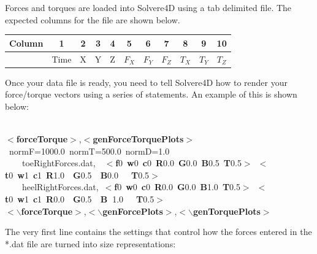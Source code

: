 \documentclass[singlecolumn,12pt]{article}
\newcommand{\hlstd}[1]{\textcolor[rgb]{0,0,0}{#1}}
\newcommand{\hlkey}[1]{\textcolor[rgb]{0,0,1}{\bf{#1}}}
\newcommand{\hlnum}[1]{\textcolor[rgb]{0.66,0,0.66}{#1}}
\begin{document}
Forces and torques are loaded into Solvere4D using a tab delimited
file. The expected columns for the file are shown below.

\vspace{1cm}
\begin{center}
\begin{tabular}{c|c|c|c|c|c|c|c|c|c|c|}
\hline Column & 1 & 2 & 3 & 4 & 5 & 6 & 7 & 8 & 9 & 10 \\
\hline & Time & X & Y & Z & $F_X$ & $F_Y$ & $F_Z$ & $T_X$ & $T_Y$ & $T_Z$\\
\end{tabular}
\end{center}
\vspace{1cm}

Once your data file is ready, you need to tell Solvere4D how to
render your force/torque vectors using a series of statements. An
example of this is shown below:

\vspace{1cm}
\hlstd{\\
}\hlkey{$<$forceTorque$>$}\hlstd{,}\hlkey{$<$genForceTorquePlots$>$}\hlstd{\ normF=}\hlnum{1000.0\ }\hlstd{normT=}\hlnum{500.0\ }\hlstd{normD=}\hlnum{1.0\\
\hlstd{\ \ \ \ }}\hlstd{toeRightForces.dat,\hlstd{\ \ }}\hlkey{$<$f}\hlnum{0\ }\hlkey{w}\hlnum{0\ }\hlkey{c}\hlnum{0\ }\hlkey{R}\hlnum{0.0\ }\hlkey{G}\hlnum{0.0\ }\hlkey{B}\hlnum{0.5\ }\hlkey{T}\hlnum{0.5}\hlkey{$>$}\hlstd{\ }\hlkey{$<$t}\hlnum{0\ }\hlkey{w}\hlnum{1\ }\hlkey{c}\hlnum{1\ }\hlkey{R}\hlnum{1.0\ \ }\hlkey{G}\hlnum{0.5\ \ }\hlkey{B}\hlnum{0.0\ \ \ }\hlkey{T}\hlnum{0.5}\hlkey{$>$}\hlstd{\\
\hlstd{\ \ \ \ }heelRightForces.dat,\ }\hlkey{$<$f}\hlnum{0\ }\hlkey{w}\hlnum{0\ }\hlkey{c}\hlnum{0\ }\hlkey{R}\hlnum{0.0\ }\hlkey{G}\hlnum{0.0\ }\hlkey{B}\hlnum{1.0\ }\hlkey{T}\hlnum{0.5}\hlkey{$>$}\hlstd{\ }\hlkey{$<$t}\hlnum{0\ }\hlkey{w}\hlnum{1\ }\hlkey{c}\hlnum{1\ }\hlkey{R}\hlnum{0.0\ \ }\hlkey{G}\hlnum{0.5\ \ }\hlkey{B\ }\hlnum{1.0\ \ \ }\hlkey{T}\hlnum{0.5}\hlkey{$>$}\hlstd{\\
}\hlkey{$<$$\backslash$forceTorque$>$}\hlstd{,}\hlkey{$<$$\backslash$genForcePlots$>$}\hlstd{,}\hlkey{$<$$\backslash$genTorquePlots$>$}
\vspace{1cm}

The very first line contains the settings that control how the
forces entered in the *.dat file are turned into size
representations:
\end{document}
